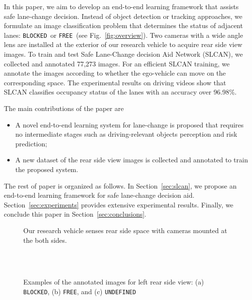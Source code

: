 \documentclass[letterpaper, 10pt, conference]{ieeeconf}
\newcommand{\B}{{\tt BLOCKED}}
\newcommand{\F}{{\tt FREE}}
\newcommand{\ud}{{\tt UNDEFINED}}
\begin{document}
	In this paper, we aim to develop an end-to-end learning framework that assists 
safe lane-change decision. Instead of object detection or tracking approaches, we formulate an image
classification problem that determines the status of adjacent lanes: \B~or
\F~(see Fig.~\ref{fig:overview}). Two cameras with a wide angle lens are installed at
the exterior of our research vehicle to acquire rear side view images. To
train and test Safe Lane-Change decision Aid Network (SLCAN), we collected and annotated
77,273 images. For an efficient SLCAN training, we annotate the images according to
whether the ego-vehicle can move on the corresponding space. The experimental results
on driving videos show that SLCAN classifies occupancy status of the lanes with an accuracy over 96.98\%.
   
	The main contributions of the paper are 
	\begin{itemize}
	\item A novel end-to-end learning system for lane-change is proposed that requires
	 no intermediate stages such as driving-relevant objects perception and risk prediction; 
	\item A new dataset of the rear side view images is collected and annotated to
	 train the proposed system.
	\end{itemize}

	The rest of paper is organized as follows. In Section~\ref{sec:slcan}, we propose
an end-to-end learning framework for safe lane-change decision aid. 
Section~\ref{sec:experiments} provides extensive experimental results. Finally, we
conclude this paper in Section~\ref{sec:conclusions}.

   
	\begin{figure}[t]
		\centering      
      	\caption{Our research vehicle senses rear side space with cameras mounted at
the both sides.}\label{fig:vehicle}\vspace{-0.3cm}
   \end{figure}

	\begin{figure}[t]
		\centering      
		\setcounter{subfigure}{0}
		\\
		\setcounter{subfigure}{1}
		\\
      
		\setcounter{subfigure}{2}
      
		\caption{Examples of the annotated images for left rear side view: (a) \B, (b) \F, and (c) \ud}\label{fig:examples}
   \end{figure}
   
\end{document}
